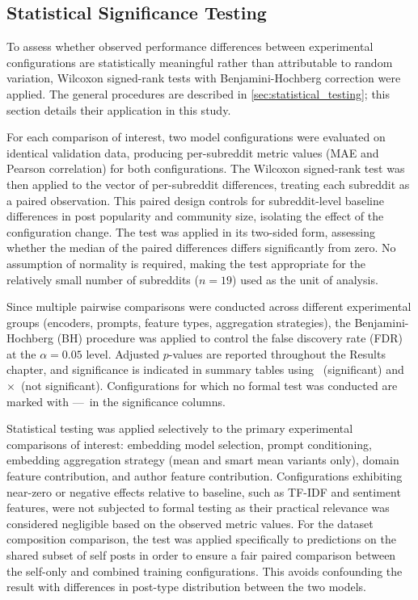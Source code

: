 \subsection{Statistical Significance Testing}

To assess whether observed performance differences between experimental configurations are statistically meaningful rather than attributable to random variation, Wilcoxon signed-rank tests with Benjamini-Hochberg correction were applied. The general procedures are described in \autoref{sec:statistical_testing}; this section details their application in this study.

For each comparison of interest, two model configurations were evaluated on identical validation data, producing per-subreddit metric values (MAE and Pearson correlation) for both configurations. 
The Wilcoxon signed-rank test was then applied to the vector of per-subreddit differences, treating each subreddit as a paired observation. 
This paired design controls for subreddit-level baseline differences in post popularity and community size, isolating the effect of the configuration change.
The test was applied in its two-sided form, assessing whether the median of the paired differences differs significantly from zero. 
No assumption of normality is required, making the test appropriate for the relatively small number of subreddits ($n = 19$) used as the unit of analysis.

Since multiple pairwise comparisons were conducted across different experimental groups (encoders, prompts, feature types, aggregation strategies), the Benjamini-Hochberg (BH) procedure was applied to control the false discovery rate (FDR) at the $\alpha = 0.05$ level. Adjusted $p$-values are reported throughout the Results chapter, and significance is indicated in summary tables using \checkmark~(significant) and $\times$~(not significant). Configurations for which no formal test was conducted are marked with ---\ in the significance columns.

Statistical testing was applied selectively to the primary experimental comparisons of interest: embedding model selection, prompt conditioning, embedding aggregation strategy (mean and smart mean variants only), domain feature contribution, and author feature contribution. Configurations exhibiting near-zero or negative effects relative to baseline, such as TF-IDF and sentiment features, were not subjected to formal testing as their practical relevance was considered negligible based on the observed metric values.
For the dataset composition comparison, the test was applied specifically to predictions on the shared subset of self posts in order to ensure a fair paired comparison between the self-only and combined training configurations. This avoids confounding the result with differences in post-type distribution between the two models.


